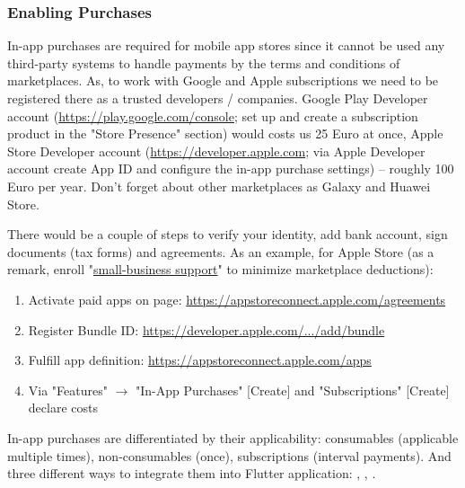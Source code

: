 \subsubsection{Enabling Purchases}

In-app purchases are required for mobile app stores since it cannot be used any third-party systems to handle payments
by the terms and conditions of marketplaces. As, to work with Google and Apple subscriptions we need to be registered 
there as a trusted developers / companies. Google Play Developer account 
(\href{https://play.google.com/console}{https://play.google.com/console}; set up and create a subscription product in 
the "Store Presence" section) would costs us 25 Euro at once, Apple Store Developer account 
(\href{https://developer.apple.com}{https://developer.apple.com}; via Apple Developer account create App ID and 
configure the in-app purchase settings) -- roughly 100 Euro per year. Don't forget about other marketplaces as 
Galaxy and Huawei Store.

There would be a couple of steps to verify your identity, add bank account, sign documents (tax forms) and agreements.
As an example, for Apple Store (as a remark, enroll 
"\href{https://developer.apple.com/app-store/small-business-program/enroll/}{small-business support}"
to minimize marketplace deductions):
\begin{enumerate}
  \item Activate paid apps on page: \href{https://appstoreconnect.apple.com/agreements}{https://appstoreconnect.apple.com/agreements}
  \item Register Bundle ID: 
  \href{https://developer.apple.com/account/resources/identifiers/bundleId/add/bundle}{https://developer.apple.com/.../add/bundle}
  \item Fulfill app definition: 
  \href{https://appstoreconnect.apple.com/apps}{https://appstoreconnect.apple.com/apps}
  \item Via "Features" $\rightarrow$ "In-App Purchases" [Create] and "Subscriptions" [Create] declare costs
\end{enumerate}

In-app purchases are differentiated by their applicability: consumables (applicable multiple times), non-consumables 
(once), subscriptions (interval payments). And three different ways to integrate them into Flutter application:
, , .
